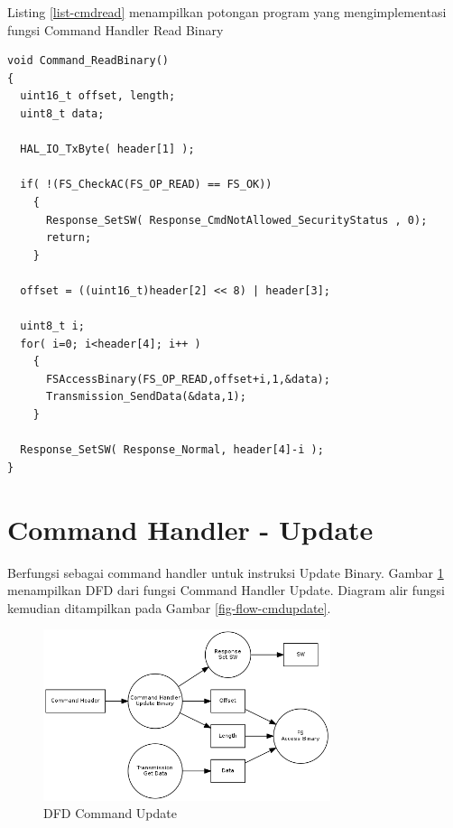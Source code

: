 Listing \ref{list-cmdread} menampilkan potongan program yang mengimplementasi fungsi Command Handler Read Binary

\begin{lstlisting}[caption={Kode Progrem Fungsi Command Handler Read Binary}, label={list-cmdread}]
void Command_ReadBinary()
{
  uint16_t offset, length;
  uint8_t data;

  HAL_IO_TxByte( header[1] );

  if( !(FS_CheckAC(FS_OP_READ) == FS_OK))
    {
      Response_SetSW( Response_CmdNotAllowed_SecurityStatus , 0);
      return;
    }

  offset = ((uint16_t)header[2] << 8) | header[3];

  uint8_t i;
  for( i=0; i<header[4]; i++ ) 
    {
      FSAccessBinary(FS_OP_READ,offset+i,1,&data);
      Transmission_SendData(&data,1);
    }

  Response_SetSW( Response_Normal, header[4]-i );
}
\end{lstlisting}

\section{Command Handler - Update}
\label{sec_cmdupdate}

Berfungsi sebagai command handler untuk instruksi Update Binary. Gambar \ref{fig-dfd-cmdupdate} menampilkan DFD dari fungsi Command Handler Update. Diagram alir fungsi kemudian ditampilkan pada Gambar \ref{fig-flow-cmdupdate}. 

\begin{figure}[h]
\centering
\includegraphics[width=0.75\textwidth]{image/command/dfd_cmdupdate.png}
\caption{DFD Command Update}
\label{fig-dfd-cmdupdate}
\end{figure}

